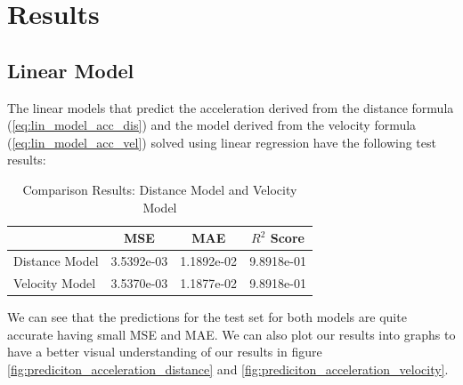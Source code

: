 \section{Results}

\subsection{Linear Model}

The linear models that predict the acceleration derived from the distance formula
(\ref{eq:lin_model_acc_dis}) and the model derived from the velocity formula (\ref{eq:lin_model_acc_vel}) solved using linear regression have the following test results:


\begin{table}[h]
\centering
\caption{Comparison Results: Distance Model and Velocity Model}
\label{tab:model_comparison}
\begin{tabular}{l S[table-format=1.4e-2] S[table-format=1.4e-2] S[table-format=1.4e-2]}
\toprule
 & {MSE} & {MAE} & {$R^2$ Score} \\
\midrule
Distance Model & 3.5392e-03 & 1.1892e-02 & 9.8918e-01 \\
Velocity Model & 3.5370e-03 & 1.1877e-02 & 9.8918e-01 \\
\bottomrule
\end{tabular}
\end{table}

We can see that the predictions for the test set for both models are quite accurate having small MSE and MAE. 
We can also plot our results into graphs to have a better visual understanding of our results 
in figure \ref{fig:prediciton_acceleration_distance} and \ref{fig:prediciton_acceleration_velocity}.

